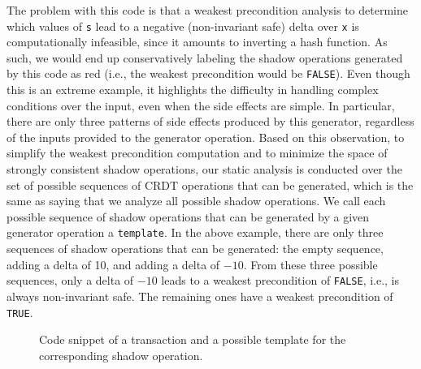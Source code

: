The problem with this code is that 
a weakest precondition analysis to determine which values of {\tt s} lead to a
negative (non-invariant safe) delta over {\tt x} is computationally
infeasible, since it amounts to inverting a hash function.
As such, we would end up conservatively labeling the shadow operations
generated by this code as red (i.e., the weakest precondition would
be {\tt FALSE}). Even though this is an extreme example, it highlights the difficulty
in handling complex conditions over the input,
even when the side effects are simple.
In particular, there are only
three patterns of side effects produced by this generator, regardless
of the inputs provided to the generator operation. Based on this observation,
to simplify the weakest precondition computation
and to minimize the space of strongly consistent shadow operations,
our static analysis is conducted over the
set of possible sequences of CRDT operations that can be generated,
which is the same as saying that we analyze all possible 
shadow operations. We call each possible sequence of shadow operations 
that can be generated by a given generator operation a \texttt{template}. 
In the above example, there are only three sequences of shadow operations that can be
generated: the empty sequence, adding a delta of 10, and adding
a delta of $-10$. From these three possible sequences, only a delta
of $-10$ leads to a weakest precondition of {\tt FALSE}, i.e.,
is always non-invariant safe. The remaining
ones have a weakest precondition of {\tt TRUE}. 

\begin{figure*}[t!]
\begin{minipage}[b]{.42\textwidth}
\end{minipage}
\begin{minipage}[b]{.56\textwidth}
\end{minipage}
\caption{Code snippet of a transaction and a possible template for the corresponding shadow operation.}
\label{fig:codeDoBuy}
\end{figure*}


